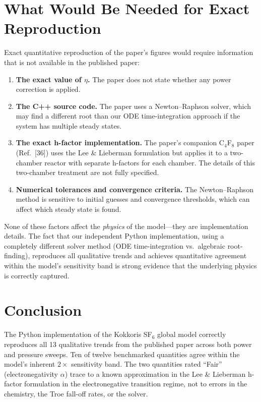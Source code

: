 \documentclass[11pt,a4paper]{article}
\begin{document}
\section{What Would Be Needed for Exact Reproduction}

Exact quantitative reproduction of the paper's figures would require information that is not available in the published paper:

\begin{enumerate}[nosep]
\item \textbf{The exact value of $\eta$.} The paper does not state whether any power correction is applied.
\item \textbf{The C++ source code.} The paper uses a Newton--Raphson solver, which may find a different root than our ODE time-integration approach if the system has multiple steady states.
\item \textbf{The exact h-factor implementation.} The paper's companion C$_4$F$_8$ paper (Ref.~[36]) uses the Lee \& Lieberman formulation but applies it to a two-chamber reactor with separate h-factors for each chamber. The details of this two-chamber treatment are not fully specified.
\item \textbf{Numerical tolerances and convergence criteria.} The Newton--Raphson method is sensitive to initial guesses and convergence thresholds, which can affect which steady state is found.
\end{enumerate}

None of these factors affect the \emph{physics} of the model---they are implementation details. The fact that our independent Python implementation, using a completely different solver method (ODE time-integration vs.\ algebraic root-finding), reproduces all qualitative trends and achieves quantitative agreement within the model's sensitivity band is strong evidence that the underlying physics is correctly captured.

\section{Conclusion}

The Python implementation of the Kokkoris SF$_6$ global model correctly reproduces all 13 qualitative trends from the published paper across both power and pressure sweeps. Ten of twelve benchmarked quantities agree within the model's inherent $2\times$ sensitivity band. The two quantities rated ``Fair'' (electronegativity $\alpha$) trace to a known approximation in the Lee \& Lieberman h-factor formulation in the electronegative transition regime, not to errors in the chemistry, the Troe fall-off rates, or the solver.
\end{document}
